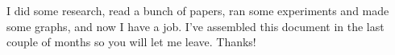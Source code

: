 

I did some research, read a bunch of papers, ran some experiments and made some graphs, and now I have a job. I've assembled this document in the last couple of months so you will let me leave.  Thanks!